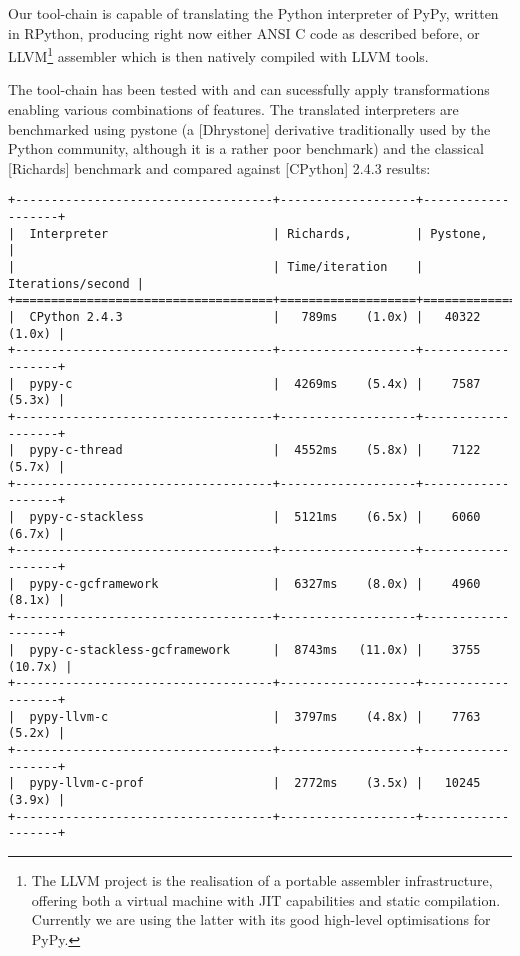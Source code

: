 \documentclass{acm_proc_article-sp}
\begin{document}
Our tool-chain is capable of translating the Python interpreter of
PyPy, written in RPython, producing right now either ANSI C code as
described before, or LLVM\footnote{The LLVM project is the realisation
of a portable assembler infrastructure, offering both a virtual
machine with JIT capabilities and static compilation. Currently we are
using the latter with its good high-level optimisations for PyPy.}
assembler which is then natively compiled with LLVM tools.

The tool-chain has been tested with and can sucessfully apply
transformations enabling various combinations of features. The
translated interpreters are benchmarked using pystone (a [Dhrystone]
derivative traditionally used by the Python community, although it is a
rather poor benchmark) and the classical [Richards] benchmark and
compared against [CPython] 2.4.3 results:

\begin{verbatim}
+------------------------------------+-------------------+-------------------+
|  Interpreter                       | Richards,         | Pystone,          |
|                                    | Time/iteration    | Iterations/second |
+====================================+===================+===================+
|  CPython 2.4.3                     |   789ms    (1.0x) |   40322    (1.0x) |
+------------------------------------+-------------------+-------------------+
|  pypy-c                            |  4269ms    (5.4x) |    7587    (5.3x) |
+------------------------------------+-------------------+-------------------+
|  pypy-c-thread                     |  4552ms    (5.8x) |    7122    (5.7x) |
+------------------------------------+-------------------+-------------------+
|  pypy-c-stackless                  |  5121ms    (6.5x) |    6060    (6.7x) |
+------------------------------------+-------------------+-------------------+
|  pypy-c-gcframework                |  6327ms    (8.0x) |    4960    (8.1x) |
+------------------------------------+-------------------+-------------------+
|  pypy-c-stackless-gcframework      |  8743ms   (11.0x) |    3755   (10.7x) |
+------------------------------------+-------------------+-------------------+
|  pypy-llvm-c                       |  3797ms    (4.8x) |    7763    (5.2x) |
+------------------------------------+-------------------+-------------------+
|  pypy-llvm-c-prof                  |  2772ms    (3.5x) |   10245    (3.9x) |
+------------------------------------+-------------------+-------------------+
\end{verbatim}
\end{document}
